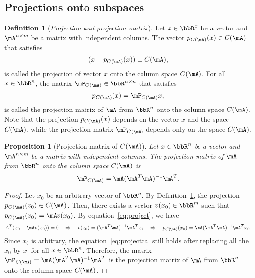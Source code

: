 \documentclass[11pt]{article}
\theoremstyle{plain}
\newtheorem{prop}{Proposition}
\theoremstyle{definition}
\newtheorem{defn}{Definition}
\begin{document}
\subsection{Projections onto subspaces}
\begin{defn}[\textit{Projection and projection matrix}]\label{def:project} Let  $x \in \bbR^{x}$ be a vector and $\mA^{n \times m}$ be a matrix with independent columns. The vector $p_{C(\mA)}(x) \in C(\mA)$ that satisfies
	\begin{equation}\label{eq:project}
		(x-p_{C(\mA)}(x)) \perp C(\mA),
	\end{equation} 
	is called the projection of vector $x$ onto the column space $C(\mA)$. For all $x \in \bbR^n$, the matrix  $\mP_{C(\mA)} \in \bbR^{n \times n}$  that satisfies	\begin{equation}
		p_{C(\mA)}(x) =\mP_{C(\mA)} x,
	\end{equation}
	is called the projection matrix of $\mA$ from $\bbR^n$ onto the column space  $C(\mA)$. Note that the projection $p_{C(\mA)}(x)$ depends on the vector $x$ and the space $C(\mA)$, while the projection matrix $\mP_{C(\mA)}$ depends only on the space $C(\mA)$. 
\end{defn}

\begin{prop}[Projection matrix of $C(\mA)$]\label{prop:project}
	Let  $x \in \bbR^{n}$ be a vector and $\mA^{n \times m}$ be a matrix with independent columns. The projection matrix of $\mA$ from $\bbR^n$ onto the column space  $C(\mA)$ is 
	\begin{equation}
		\mP_{C(\mA)} =  \mA (\mA^T \mA)^{-1} \mA^T.
	\end{equation}
\end{prop}

\begin{proof}
Let $x_0$ be an arbitrary vector of $\bbR^n$. By Definition~\ref{def:project}, the projection $p_{C(\mA)}(x_0) \in C(\mA)$. Then, there exists a vector $v(x_0) \in \bbR^m$ such that $p_{C(\mA)}(x_0) = \mA  v(x_0)$.  By equation~\eqref{eq:project}, we have 
\begin{equation}\label{eq:projectca}
	A^T (x_0 - \mA v(x_0)) = 0 \quad \Rightarrow  \quad v(x_0) = (\mA^T \mA)^{-1} \mA^T x_0 \quad \Rightarrow \quad p_{C(\mA)}(x_0)  = \mA (\mA^T \mA)^{-1} \mA^T  x_0. 
\end{equation}
Since $x_0$ is arbitrary, the equation~\eqref{eq:projectca} still holds after replacing all the $x_0$ by $x$, for all $x \in \bbR^n$. Therefore, the matrix $\mP_{C(\mA)} =  \mA (\mA^T \mA)^{-1} \mA^T$ is the projection matrix of $\mA$ from $\bbR^n$ onto the column space $C(\mA)$.
\end{proof}
 
\end{document}
